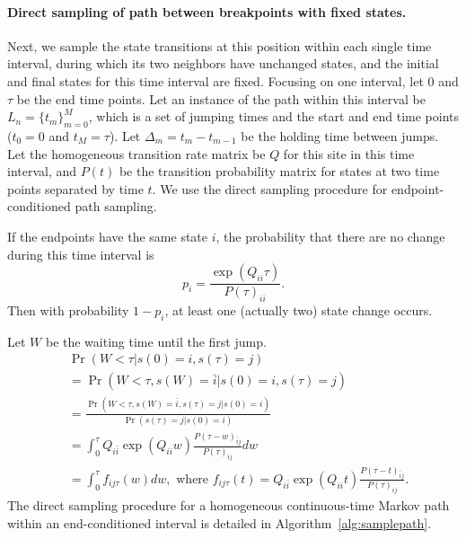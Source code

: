 \documentclass[11pt]{article}
\begin{document}
\paragraph{Direct sampling of path between breakpoints with fixed states.}
Next, we sample the state transitions at this position within each
single time interval, during which its two neighbors have unchanged
states, and the initial and final states for this time interval are
fixed.  Focusing on one interval, let $0$ and $\tau$ be the end time
points.  Let an instance of the path within this interval be $L_n =
\{t_m\}_{m=0}^{M}$, which is a set of jumping times and the start and
end time points ($t_0 = 0$ and $t_M=\tau$). Let $\Delta_m = t_m -
t_{m-1}$ be the holding time between jumps. Let the homogeneous
transition rate matrix be $Q$ for this site in this time interval, and
$P(t)$ be the transition probability matrix for states at two time
points separated by time $t$. We use the direct sampling procedure
\cite{hobolth2009simulation} for endpoint-conditioned path sampling.

If the endpoints have the same state $i$, the probability that there
are no change during this time interval is
\begin{equation} \label{eqn:pnojump}
p_i = \frac{\exp(Q_{ii}\tau)}{P(\tau)_{ii}}.
\end{equation}
Then with probability $1-p_i$, at least one (actually two) state change occurs.

Let $W$ be the waiting time until the first jump.
\begin{equation}
\begin{aligned}
& \Pr(W < \tau | s(0) = i, s(\tau) = j)  \\
& =  \Pr(W < \tau, s(W) = \bar{i} | s(0) = i, s(\tau) = j)\\
& = \frac{\Pr(W < \tau, s(W) = \bar{i},s(\tau) = j | s(0) = i) } {\Pr(s(\tau) = j | s(0) = i)}  \\
& = \int_{0}^{\tau} Q_{i\bar{i}} \exp(Q_{ii}w) \frac{P(\tau-w)_{\bar{i}j}}{P(\tau)_{ij}} dw \\
& = \int_{0}^{\tau} f_{ij\tau}(w) dw, \text{~where~}
f_{ij\tau}(t) = Q_{i\bar{i}} \exp(Q_{ii}t) \frac{P(\tau-t)_{\bar{i}j}}{P(\tau)_{ij}}.
\end{aligned}
\end{equation}
The direct sampling procedure for a homogeneous continuous-time Markov path within an end-conditioned interval is detailed in Algorithm~\ref{alg:samplepath}.
\end{document}
